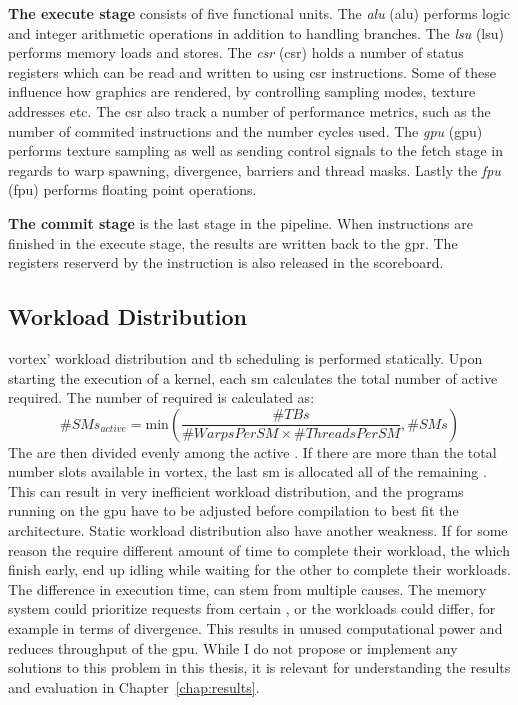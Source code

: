 \vspace{1mm}\noindent
\textbf{The execute stage} consists of five functional units. The \textit{\acrlong{alu}} (\acrshort{alu}) performs logic and integer arithmetic operations in addition to handling branches. The \textit{\acrlong{lsu}} (\acrshort{lsu}) performs memory loads and stores. The \textit{\acrlong{csr}} (\acrshort{csr}) holds a number of status registers which can be read and written to using csr instructions. Some of these influence how graphics are rendered, by controlling sampling modes, texture addresses etc. The \acrshort{csr} also track a number of performance metrics, such as the number of commited instructions and the number cycles used. The \textit{\acrlong{gpu}} (\acrshort{gpu}) performs texture sampling as well as sending control signals to the fetch stage in regards to warp spawning, divergence, barriers and thread masks. Lastly the \textit{\acrlong{fpu}} (\acrshort{fpu}) performs floating point operations.

\vspace{1mm}\noindent
\textbf{The commit stage} is the last stage in the pipeline. When instructions are finished in the execute stage, the results are written back to the \acrfull{gpr}. The registers reserverd by the instruction is also released in the scoreboard.

\subsection{Workload Distribution}

\Gls{vortex}' workload distribution and \acrshort{tb} scheduling is performed statically. Upon starting the execution of a kernel, each \acrshort{sm} calculates the total number of active  required. The number of  required is calculated as:
\begin{equation}
    \#SMs_{active} = \text{min}(\frac{\#TBs}{\#WarpsPerSM \times \#ThreadsPerSM}, \#SMs)
\end{equation}
\noindent
The  are then divided evenly among the active . If there are more  than the total number slots available in \Gls{vortex}, the last \acrshort{sm} is allocated all of the remaining . This can result in very inefficient workload distribution, and the programs running on the \acrshort{gpu} have to be adjusted before compilation to best fit the architecture. Static workload distribution also have another weakness. If for some reason the  require different amount of time to complete their workload, the  which finish early, end up idling while waiting for the other  to complete their workloads. The difference in execution time, can stem from multiple causes. The memory system could prioritize requests from certain , or the workloads could differ, for example in terms of divergence. This results in unused computational power and reduces throughput of the \acrshort{gpu}. While I do not propose or implement any solutions to this problem in this thesis, it is relevant for understanding the results and evaluation in Chapter~\ref{chap:results}.

